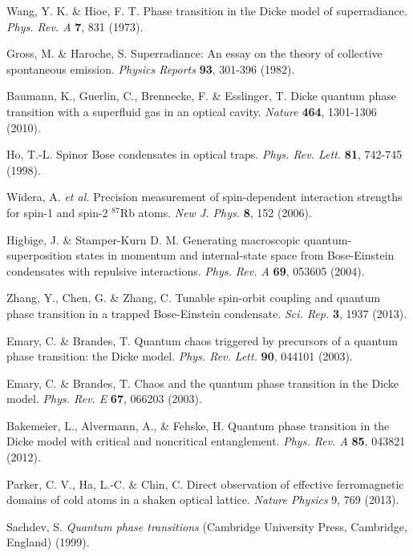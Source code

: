 \documentclass[prl,aps,twocolumn,floatfix]{revtex4}
\begin{document}
\begin{thebibliography}{99}
 Wang, Y. K. \& Hioe, F. T. Phase transition in the Dicke
model of superradiance. \textit{Phys. Rev. A} \textbf{7}, 831 (1973).

 Gross, M. \& Haroche, S. Superradiance: An essay on the
theory of collective spontaneous emission. \textit{Physics Reports} \textbf{%
93}, 301-396 (1982).

 Baumann, K., Guerlin, C., Brennecke, F. \& Esslinger, T.
Dicke quantum phase transition with a superfluid gas in an optical cavity.
\textit{Nature} \textbf{464}, 1301-1306 (2010).

 Ho, T.-L. Spinor Bose condensates in optical traps. \textit{%
Phys. Rev. Lett.} \textbf{81}, 742-745 (1998).

 Widera, A. \textit{et al.} Precision measurement of
spin-dependent interaction strengths for spin-1 and spin-2 $^{87}$Rb atoms.
\textit{New J. Phys.} \textbf{8}, 152 (2006).

 Higbige, J. \& Stamper-Kurn D. M. Generating
macroscopic quantum-superposition states in momentum and internal-state
space from Bose-Einstein condensates with repulsive interactions. \textit{%
Phys. Rev. A} \textbf{69}, 053605 (2004).

 Zhang, Y., Chen, G. \& Zhang, C. Tunable spin-orbit
coupling and quantum phase transition in a trapped Bose-Einstein condensate.
\textit{Sci. Rep.} \textbf{3}, 1937 (2013).

 Emary, C. \& Brandes, T. Quantum chaos triggered by
precursors of a quantum phase transition: the Dicke model. \textit{Phys.
Rev. Lett.} \textbf{90}, 044101 (2003).

 Emary, C. \& Brandes, T. Chaos and the quantum phase
transition in the Dicke model. \textit{Phys. Rev. E} \textbf{67}, 066203
(2003).

 Bakemeier, L., Alvermann, A., \& Fehske, H. Quantum
phase transition in the Dicke model with critical and noncritical
entanglement. \textit{Phys. Rev. A} \textbf{85}, 043821 (2012).

 Parker, C. V., Ha, L.-C. \& Chin, C. Direct observation of
effective ferromagnetic domains of cold atoms in a shaken optical lattice.
\textit{Nature Physics} 9, 769 (2013).

 Sachdev, S. \textit{Quantum phase transitions} (Cambridge
University Press, Cambridge, England) (1999).


\end{thebibliography}
\end{document}
